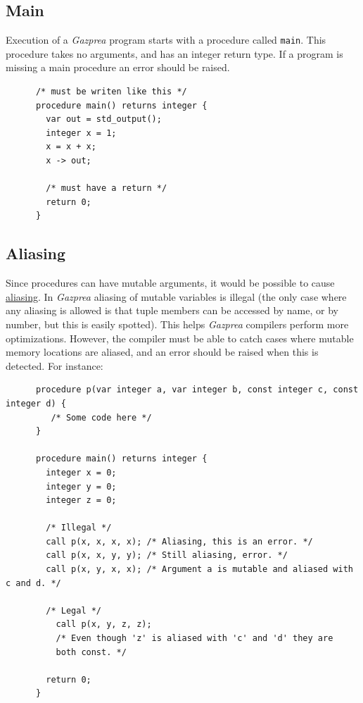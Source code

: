 \documentclass{article}
\begin{document}
  \subsection{Main}

    Execution of a \textit{Gazprea} program starts with a procedure called \texttt{main}. This procedure takes no
    arguments, and has an integer return type. If a program is missing a main procedure an error should be raised.

    \begin{lstlisting}
      /* must be writen like this */
      procedure main() returns integer {
        var out = std_output();
        integer x = 1;
        x = x + x;
        x -> out;

        /* must have a return */
        return 0;
      }
    \end{lstlisting}

  \subsection{Aliasing}

    Since procedures can have mutable arguments, it would be possible to cause
    \href{http://en.wikipedia.org/wiki/Aliasing_(computing)}{aliasing}. In \textit{Gazprea} aliasing of mutable
    variables is illegal (the only case where any aliasing is allowed is that tuple members can be accessed by name,
    or by number, but this is easily spotted). This helps \textit{Gazprea} compilers perform more optimizations.
    However, the compiler must be able to catch cases where mutable memory locations are aliased, and an error
    should be raised when this is detected. For instance:

    \begin{lstlisting}
      procedure p(var integer a, var integer b, const integer c, const integer d) {
         /* Some code here */
      }

      procedure main() returns integer {
        integer x = 0;
        integer y = 0;
        integer z = 0;

        /* Illegal */
        call p(x, x, x, x); /* Aliasing, this is an error. */
        call p(x, x, y, y); /* Still aliasing, error. */
        call p(x, y, x, x); /* Argument a is mutable and aliased with c and d. */

        /* Legal */
          call p(x, y, z, z);
          /* Even though 'z' is aliased with 'c' and 'd' they are
          both const. */

        return 0;
      }
    \end{lstlisting}
\end{document}
